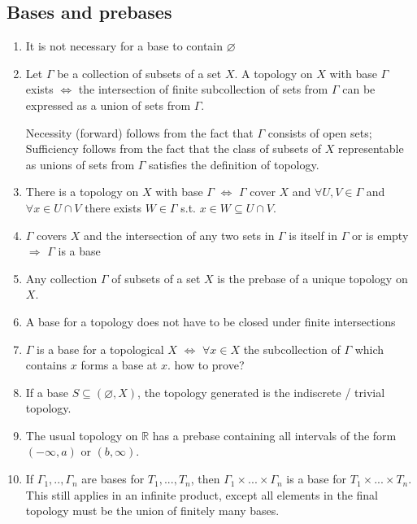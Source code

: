 \documentclass{article}
\begin{document}
\subsection{Bases and prebases}
\begin{enumerate}
\item It is not necessary for a base to contain \(\varnothing\)
\item Let \(\Gamma\) be a collection of subsets of a set \(X\). A topology on \(X\) with base \(\Gamma\) exists \(\Longleftrightarrow\) 
the intersection of finite subcollection of sets from \(\Gamma\) can be expressed as a union of sets from \(\Gamma\).

Necessity (forward) follows from the fact that \(\Gamma\) consists of open sets; Sufficiency follows from the fact that the class of subsets of \(X\) representable as unions of sets from \(\Gamma\) satisfies the definition of topology.
\item There is a topology on \(X\) with base \(\Gamma\) \(\Longleftrightarrow\) \(\Gamma\) cover \(X\) and \(\forall U,V\in\Gamma\) and \(\forall x\in U\cap V\) there exists \(W\in\Gamma\) s.t. \(x\in W\subseteq U\cap V\).
\item \(\Gamma\) covers \(X\) and the intersection of any two sets in \(\Gamma\) is itself in \(\Gamma\) or is empty \(\Longrightarrow\) \(\Gamma\) is a base
\item Any collection \(\Gamma\) of subsets of a set \(X\) is the prebase of a unique topology on \(X\).
\item A base for a topology does not have to be closed under finite intersections
\item \(\Gamma\) is a base for a topological \(X\) \(\Longleftrightarrow\) \(\forall x\in X\) the subcollection of \(\Gamma\) which contains \(x\) forms a base at \(x\). \color{red}how to prove?\color{black}
\item If a base \(S\subseteq(\varnothing,X)\), the topology generated is the indiscrete / trivial topology.
\item The usual topology on \(\mathbb{R}\) has a prebase containing all intervals of the form \((-\infty,a)\) or \((b,\infty)\).
\item If \(\Gamma_{1},..,\Gamma_{n}\) are bases for \(T_{1},...,T_{n}\), then \(\Gamma_{1}\times...\times\Gamma_{n}\) is a base for \(T_{1}\times...\times T_{n}\). This still applies in an infinite product, except all elements in the final topology must be the union of finitely many bases.
\end{enumerate}
\end{document}
